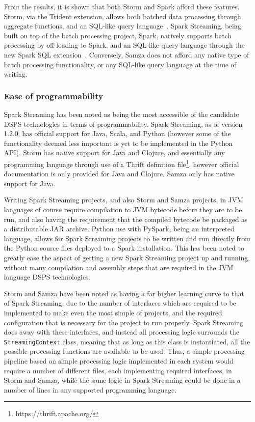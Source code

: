 From the results, it is shown that both Storm and Spark afford these features.
Storm, via the Trident extension, allows both batched data processing through aggregate functions, and an SQL-like query
language~\cite{web:storm-trident}. Spark Streaming, being built on top of the batch processing project, Spark, natively
supports batch processing by off-loading to Spark, and an SQL-like query language through the new Spark SQL extension~\cite{web:sparksql}.
Conversely, Samza does not afford any native type of batch processing functionality, or any SQL-like query language at
the time of writing.


\subsubsection{Ease of programmability}

Spark Streaming has been noted as being the most accessible of the candidate DSPS technologies in terms of programmability.
Spark Streaming, as of version 1.2.0, has official support for Java, Scala, and Python (however some of the functionality deemed
less important is yet to be implemented in the Python API). Storm has native support for Java and Clojure, and essentially
any programming language through use of a Thrift definition file\footnote{https://thrift.apache.org/}, however official
documentation is only provided for Java and Clojure. Samza only has native support for Java.

Writing Spark Streaming projects, and also Storm and Samza projects,
in JVM languages of course require compilation to JVM bytecode before they are to be run, and also having the requirement
that the compiled bytecode be packaged as a distributable JAR archive. Python use with PySpark, being an
interpreted language, allows for Spark Streaming projects to be written and run directly from the Python source files
deployed to a Spark installation. This has been noted to greatly ease the aspect of getting a new Spark Streaming project
up and running, without many compilation and assembly steps that are required in the JVM language DSPS technologies.

Storm and Samza have been noted as having a far higher learning curve to that of Spark Streaming, due to the number of
interfaces which are required to be implemented to make even the most simple of projects, and the required configuration
that is necessary for the project to run properly. Spark Streaming does away with these interfaces, and instead all processing
logic surrounds the \texttt{StreamingContext} class, meaning that as long as this class is instantiated, all the possible processing
functions are available to be used. Thus, a simple processing pipeline based on simple processing logic implemented in each
system would require a number of different files, each implementing required interfaces, in Storm and Samza, while the
same logic in Spark Streaming could be done in a number of lines in any supported programming language.

